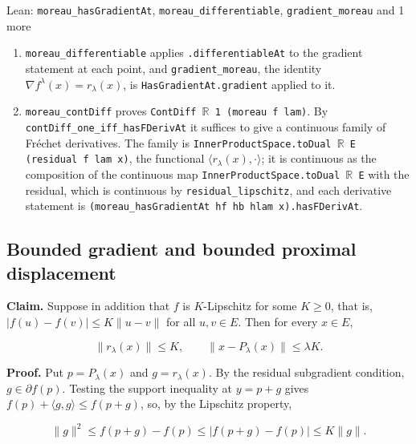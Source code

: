 \documentclass[11pt,a4paper]{report}
\begin{document}
\begin{leanbox}{Lean: \texttt{moreau\_\allowbreak{}hasGradientAt}, \texttt{moreau\_\allowbreak{}differentiable}, \texttt{gradient\_\allowbreak{}moreau} and 1 more}
\begin{enumerate}
\item \texttt{moreau\_\allowbreak{}differentiable} applies \texttt{.\allowbreak{}differentiable\allowbreak{}At} to the gradient statement at each point, and \texttt{gradient\_\allowbreak{}moreau}, the identity \(\nabla f^\lambda(x)=r_\lambda(x)\), is \texttt{Has\allowbreak{}Gradient\allowbreak{}At.\allowbreak{}gradient} applied to it.

\item \texttt{moreau\_\allowbreak{}cont\allowbreak{}Diff} proves \texttt{Cont\allowbreak{}Diff \ensuremath{\mathbb R} 1 (moreau f lam)}. By \texttt{cont\allowbreak{}Diff\_\allowbreak{}one\_\allowbreak{}iff\_\allowbreak{}has\allowbreak{}FDeriv\allowbreak{}At} it suffices to give a continuous family of Fréchet derivatives. The family is \texttt{Inner\allowbreak{}Product\allowbreak{}Space.\allowbreak{}to\allowbreak{}Dual \ensuremath{\mathbb R} E (residual f lam x)}, the functional \(\langle r_\lambda(x),\cdot\rangle\); it is continuous as the composition of the continuous map \texttt{Inner\allowbreak{}Product\allowbreak{}Space.\allowbreak{}to\allowbreak{}Dual \ensuremath{\mathbb R} E} with the residual, which is continuous by \texttt{residual\_\allowbreak{}lipschitz}, and each derivative statement is \texttt{(moreau\_\allowbreak{}has\allowbreak{}Gradient\allowbreak{}At hf hb hlam x).\allowbreak{}has\allowbreak{}FDeriv\allowbreak{}At}.

\end{enumerate}
\end{leanbox}
\subsection{\texorpdfstring{Bounded gradient and bounded proximal displacement}{Bounded gradient and bounded proximal displacement}}
\label{report-step-ProximalLangevin-Moreau-lean-5}


\textbf{Claim.} Suppose in addition that \(f\) is \(K\)-Lipschitz for some \(K\ge0\), that is, \(|f(u)-f(v)|\le K\|u-v\|\) for all \(u,v\in E\). Then for every \(x\in E\),


\[\|r_\lambda(x)\|\le K,\qquad\|x-P_\lambda(x)\|\le\lambda K.\]


\textbf{Proof.} Put \(p=P_\lambda(x)\) and \(g=r_\lambda(x)\). By the residual subgradient condition, \(g\in\partial f(p)\). Testing the support inequality at \(y=p+g\) gives \(f(p)+\langle g,g\rangle\le f(p+g)\), so, by the Lipschitz property,


\[\|g\|^2\le f(p+g)-f(p)\le|f(p+g)-f(p)|\le K\|g\|.\]
\end{document}

